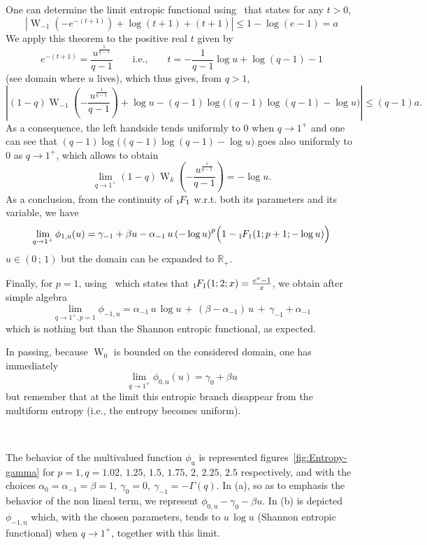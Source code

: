 \documentclass[entropy,article,submit,moreauthors,pdftex]{Definitions/mdpi}
\def\Rset{\mathbb{R}}%
\def\W{\operatorname{W}} %
\newcommand{\hypgeom}[2]{\mbox{}_{#1}\hspace{-1pt}F_{#2}}%
\def\u{\mathrm{u}}
\begin{document}
One can  determine the limit entropic  functional using~\cite[Th.~3.2]{AlzSal18}
that states for any $t > 0$,
%
\[
\left| \W_{-1}\left(  - e^{-(t+1)} \right) +  \log(t+1) + (t+1) \right|  \le 1 -
\log(e-1) = a
\]
%
We apply this theorem to the positive real $t$ given by
%
\[
e^{-(t+1)}  =  \frac{u^{\frac{1}{q-1}}}{q-1}  \qquad  \mbox{i.e.,}  \qquad  t  =
-\frac{1}{q-1} \log u + \log(q-1) - 1
\]
%
(see domain where $u$ lives), which thus gives, from $q > 1$,
%
\[
\left| (1-q)  \W_{-1}\left( - \frac{u^{\frac{1}{q-1}}}{q-1}  \right) + \log  u -
(q-1) \log \Big( (q-1) \log(q-1) - \log u \Big) \right| \le (q-1) a.
\]
%
As a consequence,  the left handside tends  uniformly to 0 when $q  \to 1^+$ and
one can  see that $(q-1) \log  \Big( (q-1) \log(q-1)  - \log u \Big)$  goes also
uniformly to 0 as $q \to 1^+$, which allows to obtain
%
\[
\lim_{q \to  1^+} (1-q) \W_k\left(  - \frac{u^{\frac{1}{q-1}}}{q-1} \right)  = -
\log u. 
\]
%
As  a  conclusion, from  the  continuity  of  $\hypgeom{1}{1}$ w.r.t.  both  its
parameters and its variable, we have
%
\[
\lim_{q \to 1^+}  \phi_{1,\u}(u) = \gamma_{-1} +  \beta u - \alpha_{-1}  \, u \,
\left( - \log u \right)^p \Big(1 - \hypgeom{1}{1}( 1 ; p+1 ; - \log u) \Big)
\]
%
$u \in ( 0 \, ; \, 1)$ but the domain can be expanded to $\Rset_+$.

Finally,  for   $p  =  1$,  using~\cite[13.6.14]{AbrSte70}   which  states  that
$\hypgeom{1}{1}(1 ; 2 ; x) = \frac{e^x - 1}{x}$, we obtain after simple algebra
%
\[
\lim_{q  \to  1^+,p=1} \phi_{-1,\u}  =  \alpha_{-1}  \, u  \,  \log  u \,  +  \,
(\beta-\alpha_{-1}) \, u \, + \, \gamma_{-1}+\alpha_{-1}
\]
%
which is nothing but than the Shannon entropic functional, as expected. 

In  passing,  because $\W_0$  is  bounded  on  the  considered domain,  one  has
immediately
%
\[
\lim_{q \to 1^+}  \phi_{0,\u}(u) = \gamma_0 +  \beta u
\]
%
but remember that at the limit this entropic branch disappear from the multiform
entropy (i.e., the entropy becomes uniform).

\

The   behavior   of   the   multivalued  function   $\phi_\u$   is   represented
figures~\ref{fig:Entropy-gamma} for $p = 1, q =  1.02, \, 1.25, \, 1.5, \, 1.75,
\,  2,  \,  2.25,  \,  2.5$  respectively, and  with  the  choices  $\alpha_0  =
\alpha_{-1} = \beta = 1, \: \gamma_0 = 0, \: \gamma_{-1} = - \Gamma(q)$. In (a),
so as to emphasis the behavior of the non lineal term, we represent $\phi_{0,\u}
- \gamma_0 - \beta u$. In (b)  is depicted $\phi_{-1,\u}$ which, with the chosen
parameters, tends  to $u \,  \log u$ (Shannon  entropic functional) when  $q \to
1^+$, together with this limit.
\end{document}
